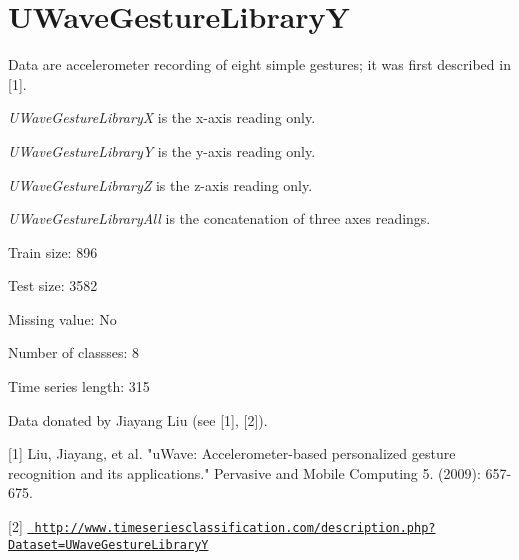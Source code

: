 \chapter{UWave\+Gesture\+LibraryY}
\hypertarget{md_external_2data_2UCRArchive__2018_2UWaveGestureLibraryY_2README}{}\label{md_external_2data_2UCRArchive__2018_2UWaveGestureLibraryY_2README}
\label{md_external_2data_2UCRArchive__2018_2UWaveGestureLibraryY_2README_autotoc_md227}%
%
 Data are accelerometer recording of eight simple gestures; it was first described in \mbox{[}1\mbox{]}.

{\itshape UWave\+Gesture\+LibraryX} is the x-\/axis reading only.

{\itshape UWave\+Gesture\+LibraryY} is the y-\/axis reading only.

{\itshape UWave\+Gesture\+LibraryZ} is the z-\/axis reading only.

{\itshape UWave\+Gesture\+Library\+All} is the concatenation of three axes readings.

Train size\+: 896

Test size\+: 3582

Missing value\+: No

Number of classses\+: 8

Time series length\+: 315

Data donated by Jiayang Liu (see \mbox{[}1\mbox{]}, \mbox{[}2\mbox{]}).

\mbox{[}1\mbox{]} Liu, Jiayang, et al. "{}u\+Wave\+: Accelerometer-\/based personalized gesture recognition and its applications."{} Pervasive and Mobile Computing 5. (2009)\+: 657-\/675.

\mbox{[}2\mbox{]} \href{http://www.timeseriesclassification.com/description.php?Dataset=UWaveGestureLibraryY}{\texttt{ http\+://www.\+timeseriesclassification.\+com/description.\+php?\+Dataset=\+UWave\+Gesture\+LibraryY}} 